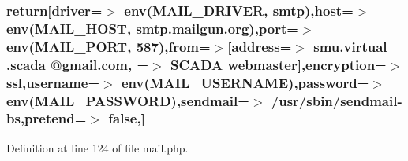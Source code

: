 \subsubsection[{return}]{\setlength{\rightskip}{0pt plus 5cm}return[\textquotesingle{}driver\textquotesingle{}=$>$ env(\textquotesingle{}M\+A\+I\+L\+\_\+\+D\+R\+I\+V\+E\+R\textquotesingle{}, \textquotesingle{}smtp\textquotesingle{}),\textquotesingle{}host\textquotesingle{}=$>$ env(\textquotesingle{}M\+A\+I\+L\+\_\+\+H\+O\+S\+T\textquotesingle{}, \textquotesingle{}smtp.\+mailgun.\+org\textquotesingle{}),\textquotesingle{}port\textquotesingle{}=$>$ env(\textquotesingle{}M\+A\+I\+L\+\_\+\+P\+O\+R\+T\textquotesingle{}, 587),\textquotesingle{}from\textquotesingle{}=$>$[\textquotesingle{}address\textquotesingle{}=$>$ \textquotesingle{}smu.\+virtual .scada @gmail.\+com\textquotesingle{}, \textquotesingle{}=$>$ \textquotesingle{}S\+C\+A\+D\+A webmaster\textquotesingle{}],\textquotesingle{}encryption\textquotesingle{}=$>$ \textquotesingle{}ssl\textquotesingle{},\textquotesingle{}username\textquotesingle{}=$>$ env(\textquotesingle{}M\+A\+I\+L\+\_\+\+U\+S\+E\+R\+N\+A\+M\+E\textquotesingle{}),\textquotesingle{}password\textquotesingle{}=$>$ env(\textquotesingle{}M\+A\+I\+L\+\_\+\+P\+A\+S\+S\+W\+O\+R\+D\textquotesingle{}),\textquotesingle{}sendmail\textquotesingle{}=$>$ \textquotesingle{}/usr/sbin/sendmail-\/bs\textquotesingle{},\textquotesingle{}pretend\textquotesingle{}=$>$ false,]}\label{config_2mail_8php_a2b3f0e452c617eaf20a2d0a3f591bc26}


Definition at line 124 of file mail.\+php.

